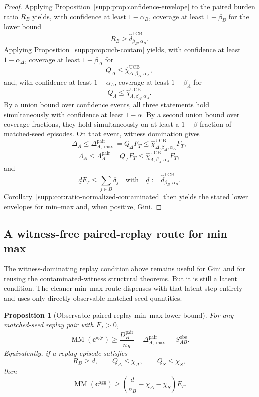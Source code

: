 \documentclass[11pt]{article}
\newcommand{\1}{\mathbf{1}}
\newcommand{\MM}{\operatorname{MM}}
\theoremstyle{definition}
\theoremstyle{plain}
\newtheorem{proposition}[definition]{Proposition}
\theoremstyle{remark}
\begin{document}
\begin{proof}
Applying Proposition~\ref{supp:prop:confidence-envelope} to the paired burden ratio $R_B$ yields, with confidence at least $1-\alpha_B$, coverage at least $1-\beta_B$ for the lower bound
\[
R_B \ge \widehat d^{\mathrm{LCB}}_{\beta_B,\alpha_B}.
\]
Applying Proposition~\ref{supp:prop:ucb-contam} yields, with confidence at least $1-\alpha_\Delta$, coverage at least $1-\beta_\Delta$ for
\[
Q_\Delta \le \widehat\chi_{\Delta,\beta_\Delta,\alpha_\Delta}^{\mathrm{UCB}},
\]
and, with confidence at least $1-\alpha_\Lambda$, coverage at least $1-\beta_\Lambda$ for
\[
Q_\Lambda \le \widehat\chi_{\Lambda,\beta_\Lambda,\alpha_\Lambda}^{\mathrm{UCB}}.
\]
By a union bound over confidence events, all three statements hold simultaneously with confidence at least $1-\alpha$. By a second union bound over coverage fractions, they hold simultaneously on at least a $1-\beta$ fraction of matched-seed episodes. On that event, witness domination gives
\[
\overline\Delta_A \le \Delta_{A,\max}^{\mathrm{pair}} = Q_\Delta F_T \le \widehat\chi_{\Delta,\beta_\Delta,\alpha_\Delta}^{\mathrm{UCB}} F_T,
\]
\[
\overline\Lambda_A \le \Lambda_A^{\mathrm{pair}} = Q_\Lambda F_T \le \widehat\chi_{\Lambda,\beta_\Lambda,\alpha_\Lambda}^{\mathrm{UCB}} F_T,
\]
and
\[
\underline d F_T \le \sum_{j\in B}\delta_j \quad\text{with}\quad \underline d := \widehat d^{\mathrm{LCB}}_{\beta_B,\alpha_B}.
\]
Corollary~\ref{supp:cor:ratio-normalized-contaminated} then yields the stated lower envelopes for min--max and, when positive, Gini.
\end{proof}

\subsection{A witness-free paired-replay route for min--max}
\label{supp:subsec:witness-free-minmax}

The witness-dominating replay condition above remains useful for Gini and for reusing the contaminated-witness structural theorems. But it is still a latent condition. The cleaner min--max route dispenses with that latent step entirely and uses only directly observable matched-seed quantities.

\begin{proposition}[Observable paired-replay min--max lower bound]
\label{supp:prop:paired-minmax}
For any matched-seed replay pair with $F_T>0$,
\[
\MM(\mathbf c^{\mathrm{agg}})
\ge
\frac{D_B^{\mathrm{pair}}}{n_B}
-
\Delta_{A,\max}^{\mathrm{pair}}
-
S_{AB}^{\mathrm{obs}}.
\]
Equivalently, if a replay episode satisfies
\[
R_B \ge d,
\qquad
Q_\Delta \le \chi_\Delta,
\qquad
Q_S \le \chi_S,
\]
then
\[
\MM(\mathbf c^{\mathrm{agg}})
\ge
\left(\frac{d}{n_B}-\chi_\Delta-\chi_S\right)F_T.
\]
\end{proposition}
\end{document}
